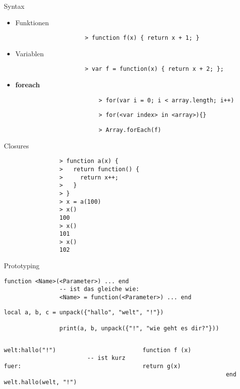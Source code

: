\documentclass{beamer}
\begin{document}
		\begin{frame}[fragile,shrink=5]{Syntax}
			\begin{itemize}
				\item Funktionen
				\begin{lstlisting}
					> function f(x) { return x + 1; }
				\end{lstlisting}
				\item Variablen
				\begin{lstlisting}
					> var f = function(x) { return x + 2; };
				\end{lstlisting}
				\item \textbf{foreach}
					\begin{lstlisting}
						> for(var i = 0; i < array.length; i++)
					\end{lstlisting}
					\begin{lstlisting}
						> for(<var index> in <array>){}
					\end{lstlisting}
					\begin{lstlisting}
						> Array.forEach(f)
					\end{lstlisting}
			\end{itemize}
		\end{frame}
		
		\begin{frame}[fragile,shrink=5]{Closures}
			\begin{lstlisting}
				> function a(x) {
				>   return function() {
				>     return x++;
				>   }
				> }
				> x = a(100)
				> x()
				100
				> x()
				101
				> x()
				102
			\end{lstlisting}
		\end{frame}
		
		\begin{frame}[fragile,shrink=5]{Prototyping}
			\lstset{numbers=none}
			\begin{lstlisting}[title={Schreibweise}]
				function <Name>(<Parameter>) ... end
				-- ist das gleiche wie:
				<Name> = function(<Parameter>) ... end
			\end{lstlisting}

			\begin{lstlisting}[title={Mehrere Rückgabewerte}]
				local a, b, c = unpack({"hallo", "welt", "!"})

				print(a, b, unpack({"!", "wie geht es dir?"}))
			\end{lstlisting}
			
			\begin{columns}
					\begin{lstlisting}[title={OOP}]
						welt:hallo("!")
						-- ist kurz fuer:
						welt.hallo(welt, "!")
					\end{lstlisting}
				
					\begin{lstlisting}[title={Proper Tail Calls}]
						function f (x)
						  return g(x)
						end
					\end{lstlisting}
			\end{columns}
		\end{frame}
		
\end{document}
